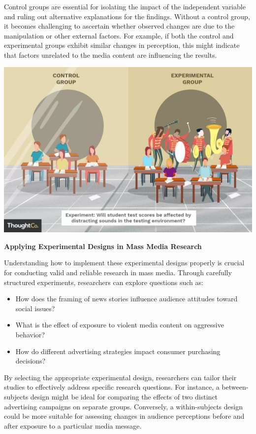 \documentclass[
]{book}
\providecommand{\tightlist}{%
  \setlength{\itemsep}{0pt}\setlength{\parskip}{0pt}}
\begin{document}
Control groups are essential for isolating the impact of the independent variable and ruling out alternative explanations for the findings. Without a control group, it becomes challenging to ascertain whether observed changes are due to the manipulation or other external factors. For example, if both the control and experimental groups exhibit similar changes in perception, this might indicate that factors unrelated to the media content are influencing the results.

\href{https://www.thoughtco.com/control-and-experimental-group-differences-606113}{\includegraphics[width=1\linewidth,height=\textheight,keepaspectratio]{images/control.jpg}}

\textbf{Applying Experimental Designs in Mass Media Research}

Understanding how to implement these experimental designs properly is crucial for conducting valid and reliable research in mass media. Through carefully structured experiments, researchers can explore questions such as:

\begin{itemize}
\tightlist
\item
  How does the framing of news stories influence audience attitudes toward social issues?
\item
  What is the effect of exposure to violent media content on aggressive behavior?
\item
  How do different advertising strategies impact consumer purchasing decisions?
\end{itemize}

By selecting the appropriate experimental design, researchers can tailor their studies to effectively address specific research questions. For instance, a between-subjects design might be ideal for comparing the effects of two distinct advertising campaigns on separate groups. Conversely, a within-subjects design could be more suitable for assessing changes in audience perceptions before and after exposure to a particular media message.
\end{document}
